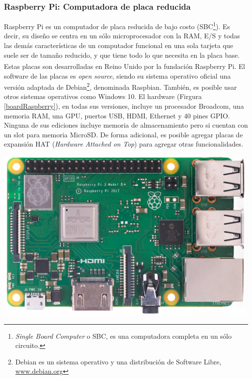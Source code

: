         \subsubsection{Raspberry Pi: Computadora de placa reducida}
            \par Raspberry\textsuperscript{\textregistered} Pi es un computador de placa reducida de bajo costo (SBC\footnote{\textit{Single Board Computer} o SBC, es una computadora completa en un sólo circuito.}). Es decir, su diseño se centra en un sólo microprocesador con la RAM, E/S y todas las demás características de un computador funcional en una sola tarjeta que suele ser de tamaño reducido, y que tiene todo lo que necesita en la placa base. Estas placas son desarrolladas en Reino Unido por la fundación Raspberry\textsuperscript{\textregistered} Pi. El software de las placas es \textit{open source}, siendo su sistema operativo oficial una versión adaptada de Debian\footnote{Debian es un sistema operativo y una distribución de Software Libre, \url{www.debian.org}}, denominada Raspbian. También, es posible usar otros sistemas operativos como Windows 10. El hardware (Firgura \ref{boardRaspberry}), en todas sus versiones, incluye un procesador Broadcom, una memoria RAM, una GPU, puertos USB, HDMI, Ethernet y 40 pines GPIO. Ninguna de sus ediciones incluye memoria de almacenamiento pero si cuentan con un slot para memoria MicroSD. De forma adicional, es posible agregar placas de expansión HAT (\textit{Hardware Attached on Top}) para agregar otras funcionalidades.
            
            \begin{center}
                \includegraphics[scale=0.30]{hardware/raspberrypib3.jpg}
                
                \label{boardRaspberry}
            \end{center}
           
